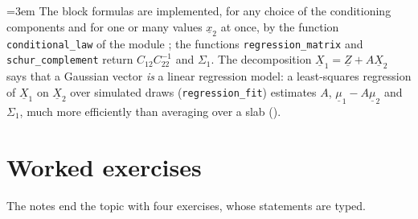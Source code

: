 \begin{remark}[computational]\label{rem:gc-code-blocks}
\emergencystretch=3em
The block formulas are implemented, for any choice of the conditioning components and for one or
many values $\underline x_2$ at once, by the function \texttt{conditional\_law} of the module
; the functions \texttt{regression\_matrix} and
\texttt{schur\_complement} return $C_{12}C_{22}^{-1}$ and $\Sigma_1$. The decomposition $\underline X_1=\underline Z+A\underline X_2$ says that a Gaussian vector \emph{is} a linear regression
model: a least-squares regression of $\underline X_1$ on $\underline X_2$ over simulated draws (\texttt{regression\_fit})
estimates $A$, $\underline\mu_1-A\underline\mu_2$ and $\Sigma_1$, much more efficiently than averaging over a slab
().
\end{remark}

\section{Worked exercises}\label{sec:gc-worked}

The notes end the topic with four exercises, whose statements are typed.

